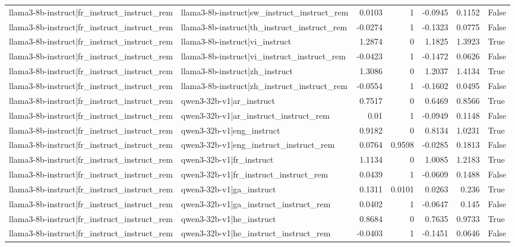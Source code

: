 \begin{table}
\begin{tabular}{l l r r r r l}
llama3-8b-instruct|fr_instruct_instruct_rem & llama3-8b-instruct|sw_instruct_instruct_rem & 0.0103 & 1 & -0.0945 & 0.1152 & False \\
llama3-8b-instruct|fr_instruct_instruct_rem & llama3-8b-instruct|th_instruct_instruct_rem & -0.0274 & 1 & -0.1323 & 0.0775 & False \\
llama3-8b-instruct|fr_instruct_instruct_rem & llama3-8b-instruct|vi_instruct & 1.2874 & 0 & 1.1825 & 1.3923 & True \\
llama3-8b-instruct|fr_instruct_instruct_rem & llama3-8b-instruct|vi_instruct_instruct_rem & -0.0423 & 1 & -0.1472 & 0.0626 & False \\
llama3-8b-instruct|fr_instruct_instruct_rem & llama3-8b-instruct|zh_instruct & 1.3086 & 0 & 1.2037 & 1.4134 & True \\
llama3-8b-instruct|fr_instruct_instruct_rem & llama3-8b-instruct|zh_instruct_instruct_rem & -0.0554 & 1 & -0.1602 & 0.0495 & False \\
llama3-8b-instruct|fr_instruct_instruct_rem & qwen3-32b-v1|ar_instruct & 0.7517 & 0 & 0.6469 & 0.8566 & True \\
llama3-8b-instruct|fr_instruct_instruct_rem & qwen3-32b-v1|ar_instruct_instruct_rem & 0.01 & 1 & -0.0949 & 0.1148 & False \\
llama3-8b-instruct|fr_instruct_instruct_rem & qwen3-32b-v1|eng_instruct & 0.9182 & 0 & 0.8134 & 1.0231 & True \\
llama3-8b-instruct|fr_instruct_instruct_rem & qwen3-32b-v1|eng_instruct_instruct_rem & 0.0764 & 0.9598 & -0.0285 & 0.1813 & False \\
llama3-8b-instruct|fr_instruct_instruct_rem & qwen3-32b-v1|fr_instruct & 1.1134 & 0 & 1.0085 & 1.2183 & True \\
llama3-8b-instruct|fr_instruct_instruct_rem & qwen3-32b-v1|fr_instruct_instruct_rem & 0.0439 & 1 & -0.0609 & 0.1488 & False \\
llama3-8b-instruct|fr_instruct_instruct_rem & qwen3-32b-v1|ga_instruct & 0.1311 & 0.0101 & 0.0263 & 0.236 & True \\
llama3-8b-instruct|fr_instruct_instruct_rem & qwen3-32b-v1|ga_instruct_instruct_rem & 0.0402 & 1 & -0.0647 & 0.145 & False \\
llama3-8b-instruct|fr_instruct_instruct_rem & qwen3-32b-v1|he_instruct & 0.8684 & 0 & 0.7635 & 0.9733 & True \\
llama3-8b-instruct|fr_instruct_instruct_rem & qwen3-32b-v1|he_instruct_instruct_rem & -0.0403 & 1 & -0.1451 & 0.0646 & False \\

\end{tabular}
\end{table}
